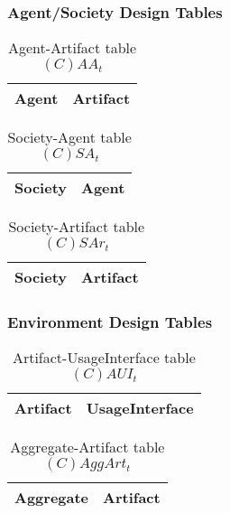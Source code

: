 \subsubsection{Agent/Society Design Tables}

\begin{table}[H]
	\centering
	\begin{tabular}{|p{4cm}|p{8cm}|}
			\hline
			\textbf{Agent} & \textbf{Artifact} \\
			\hline
			\hline
		\end{tabular}
	\caption{Agent-Artifact table $(C)AA_t$}
	\label{tab:caat}
\end{table}

\begin{table}[H]
	\centering
	\begin{tabular}{|p{4cm}|p{8cm}|}
			\hline
			\textbf{Society} & \textbf{Agent} \\
			\hline
			\hline
		\end{tabular}
	\caption{Society-Agent table $(C)SA_t$}
	\label{tab:csat}
\end{table}

\begin{table}[H]
	\centering
	\begin{tabular}{|p{4cm}|p{8cm}|}
			\hline
			\textbf{Society} & \textbf{Artifact} \\
			\hline
			\hline
		\end{tabular}
	\caption{Society-Artifact table $(C)SAr_t$}
	\label{tab:csart}
\end{table}

\subsubsection{Environment Design Tables}

\begin{table}[H]
	\centering
	\begin{tabular}{|p{4cm}|p{8cm}|}
			\hline
			\textbf{Artifact} & \textbf{UsageInterface} \\
			\hline
			\hline
		\end{tabular}
	\caption{Artifact-UsageInterface table $(C)AUI_t$}
	\label{tab:cauit}
\end{table}

\begin{table}[H]
	\centering
	\begin{tabular}{|p{4cm}|p{8cm}|}
			\hline
			\textbf{Aggregate} & \textbf{Artifact} \\
			\hline
			\hline
		\end{tabular}
	\caption{Aggregate-Artifact table $(C)AggArt_t$}
	\label{tab:caggartt}
\end{table}

